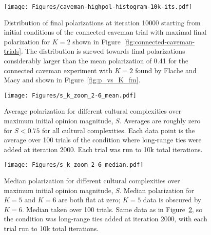 \begin{figure}[h!]
  \centering
    \texttt{[image: Figures/caveman-highpol-histogram-10k-its.pdf]}
  \caption{Distribution of final polarizations at iteration 10000
  starting from initial conditions of the connected caveman trial with 
  maximal final polarization for $K=2$ shown in 
  Figure~\ref{fig:connected-caveman-trials}.
  The distribution is skewed towards final polarizations considerably larger
  than the mean polarization of 0.41 for the connected caveman experiment
  with $K=2$ found by Flache and Macy and shown in Figure~\ref{fig:p_vs_K_fm}. 
  }
  \label{fig:highpol-histogram}
\end{figure}



\begin{figure}[t!]
  \centering
    \texttt{[image: Figures/s\_k\_zoom\_2-6\_mean.pdf]}
  \caption{Average polarization for different cultural complexities over 
    maximum initial opinion magnitude, $S$. 
    Averages are roughly zero for $S<0.75$ for all cultural complexities.
    Each data point is the average over 100 trials of the condition
    where long-range ties were added at iteration 2000. Each trial was run to 
    10k total iterations. 
  }
  \label{fig:S_average}
\end{figure}

\begin{figure}[h!]
  \centering
    \texttt{[image: Figures/s\_k\_zoom\_2-6\_median.pdf]}
  \caption{Median polarization for different cultural complexities over
    maximum initial opinion magnitude, $S$.
    Median polarization for $K=5$ and $K=6$ are both flat at zero; $K=5$ 
    data is obscured by $K=6$.  Median taken over 100 trials.
    Same data as in Figure~\ref{fig:S_average}, so the condition was
    long-range ties added at iteration 2000, with each trial run to 10k
    total iterations.
  }
  \label{fig:S_median}
\end{figure}


